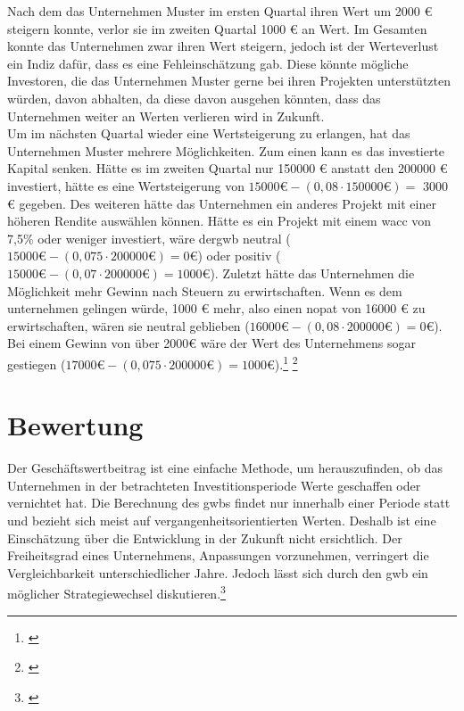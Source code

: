 Nach dem das Unternehmen Muster im ersten Quartal ihren Wert um 2000 € steigern konnte, verlor sie im zweiten Quartal 1000 € an Wert. Im Gesamten konnte das Unternehmen zwar ihren Wert steigern, jedoch ist der Werteverlust ein Indiz dafür, dass es eine Fehleinschätzung gab. Diese könnte mögliche Investoren, die das Unternehmen Muster gerne bei ihren Projekten unterstützten würden, davon abhalten, da diese davon ausgehen könnten, dass das Unternehmen weiter an Werten verlieren wird in Zukunft.\\
Um im nächsten Quartal wieder eine Wertsteigerung zu erlangen, hat das Unternehmen Muster mehrere Möglichkeiten. Zum einen kann es das investierte Kapital senken. Hätte es im zweiten Quartal nur 150000 € anstatt den 200000 € investiert, hätte es eine Wertsteigerung von $15000 \text{€} - (0,08 \cdot 150000 \text{€}) =$ 3000 € gegeben. Des weiteren hätte das Unternehmen ein anderes Projekt mit einer höheren Rendite auswählen können. Hätte es ein Projekt mit einem \ac{wacc} von 7,5\% oder weniger investiert, wäre der\ac{gwb} neutral ($15000 \text{€} - (0,075 \cdot 200000 \text{€}) = 0 \text{€}$) oder positiv ($15000 \text{€} - (0,07 \cdot 200000 \text{€}) = 1000 \text{€}$). Zuletzt hätte das Unternehmen die Möglichkeit mehr Gewinn nach Steuern zu erwirtschaften. Wenn es dem unternehmen gelingen würde, 1000 € mehr, also einen \ac{nopat} von 16000 € zu erwirtschaften, wären sie neutral geblieben ($16000 \text{€} - (0,08 \cdot 200000 \text{€}) = 0 \text{€}$). Bei einem Gewinn von über 2000€ wäre der Wert des Unternehmens sogar gestiegen ($17000 \text{€} - (0,075 \cdot 200000 \text{€}) = 1000 \text{€}$).\footnote{\cite{studyflix-eva}} \footnote{\cite{controlling-eva}}

\section{Bewertung}

Der Geschäftswertbeitrag ist eine einfache Methode, um herauszufinden, ob das Unternehmen in der betrachteten Investitionsperiode Werte geschaffen oder vernichtet hat. Die Berechnung des \ac{gwb}s findet nur innerhalb einer Periode statt und bezieht sich meist auf vergangenheitsorientierten Werten. Deshalb ist eine Einschätzung über die Entwicklung in der Zukunft nicht ersichtlich. Der Freiheitsgrad eines Unternehmens, Anpassungen vorzunehmen, verringert die Vergleichbarkeit unterschiedlicher Jahre. Jedoch lässt sich durch den \ac{gwb} ein möglicher Strategiewechsel diskutieren.\footnote{\cite{controlling-eva}}
